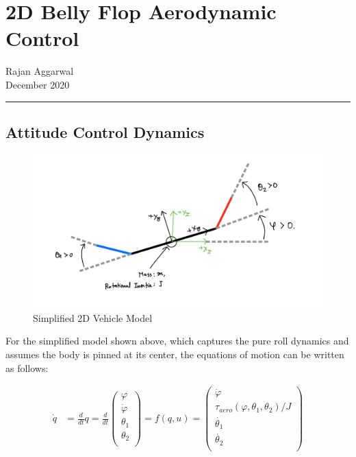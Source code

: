 \documentclass[12pt]{article}
\begin{document}
\section*{2D Belly Flop Aerodynamic Control}
Rajan Aggarwal\\
December 2020 \\
\noindent\rule{15cm}{0.4pt}

\subsection*{Attitude Control Dynamics}

\begin{figure}[h]
\centering
\includegraphics[width=.9\linewidth]{../misc/vehicle_diagram.png}
\caption{Simplified 2D Vehicle Model}
\end{figure}

For the simplified model shown above, which captures the pure roll dynamics and assumes the body is pinned at its center, the equations of motion can be written as follows:

\begin{align*}
\dot{q} &= \frac{d}{dt} q = \frac{d}{dt}\begin{pmatrix}
\varphi \\
\dot{\varphi} \\
\theta_1 \\
\theta_2 \\
\end{pmatrix}
= f(q, u) =
\begin{pmatrix}
\dot{\varphi} \\
\tau_{aero} (\varphi, \theta_1, \theta_2) / J \\
\dot{\theta_1} \\
\dot{\theta_2} \\
\end{pmatrix} \\
\end{align*}
\end{document}
